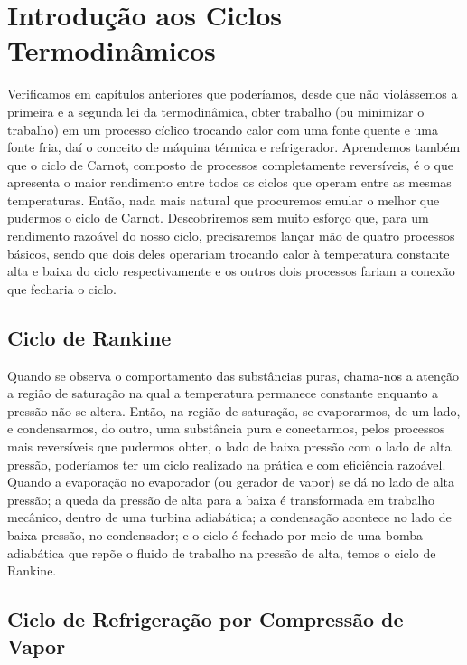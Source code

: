 \chapter{Introdução aos Ciclos Termodinâmicos}
\label{chap:thermodynamicCycles}

    Verificamos em capítulos anteriores que poderíamos, desde que não
    violássemos a primeira e a segunda lei da termodinâmica, obter trabalho (ou
    minimizar o trabalho) em um processo cíclico trocando calor com uma fonte
    quente e uma fonte fria, daí o conceito de máquina térmica e refrigerador.
    Aprendemos também que o ciclo de Carnot, composto de processos
    completamente reversíveis, é o que apresenta o maior rendimento entre todos
    os ciclos que operam entre as mesmas temperaturas. Então, nada mais natural
    que procuremos emular o melhor que pudermos o ciclo de Carnot.
    Descobriremos sem muito esforço que, para um rendimento razoável do nosso
    ciclo, precisaremos lançar mão de quatro processos básicos, sendo que dois
    deles operariam trocando calor à temperatura constante alta e baixa do
    ciclo respectivamente e os outros dois processos fariam a conexão que
    fecharia o ciclo.

    \section{Ciclo de Rankine}

    Quando se observa o comportamento das substâncias puras, chama-nos a
    atenção a região de saturação na qual a temperatura permanece constante
    enquanto a pressão não se altera. Então, na região de saturação, se
    evaporarmos, de um lado, e condensarmos, do outro, uma substância pura e
    conectarmos, pelos processos mais reversíveis que pudermos obter, o lado de
    baixa pressão com o lado de alta pressão, poderíamos ter um ciclo realizado
    na prática e com eficiência razoável.  Quando a evaporação no evaporador
    (ou gerador de vapor) se dá no lado de alta pressão; a queda da pressão de
    alta para a baixa é transformada em trabalho mecânico, dentro de uma
    turbina adiabática; a condensação acontece no lado de baixa pressão, no
    condensador; e o ciclo é fechado por meio de uma bomba adiabática que repõe
    o fluido de trabalho na pressão de alta, temos o ciclo de Rankine.

    \section{Ciclo de Refrigeração por Compressão de Vapor}

